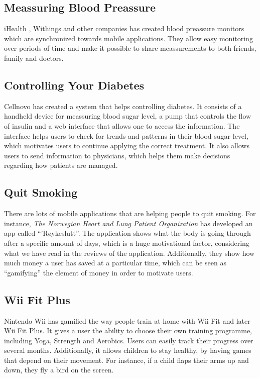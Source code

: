 \subsection{Meassuring Blood Preassure}
iHealth , Withings and other companies has created blood preassure monitors which are synchronized towards mobile applications. They allow easy monitoring over periods of time and make it possible to share meassurements to both friends, family and doctors.


\subsection{Controlling Your Diabetes}
Cellnovo has created a system that helps controlling diabetes. It consists of a handheld device for meassuring blood sugar level, a pump that controls the flow of insulin and a web interface that allows one to access the information. The interface helps users to check for trends and patterns in their blood sugar level, which motivates users to continue applying the correct treatment. It also allows users to send information to physicians, which helps them make decisions regarding how patients are managed.
      


\subsection{Quit Smoking}
There are lots of mobile applications that are helping people to quit smoking. For instance, \emph{The Norwegian Heart and Lung Patient Organization} has developed an app called ``'R\o ykeslutt''. The application shows what the body is going through after a specific amount of days, which is a huge motivational factor, considering what we have read in the reviews of the application. Additionally, they show how much money a user has saved at a particular time, which can be seen as ``gamifying'' the element of money in order to motivate users.  


\subsection{Wii Fit Plus}
Nintendo Wii has gamified the way people train at home with Wii Fit and later Wii Fit Plus. It gives a user the ability to choose their own training programme, including Yoga, Strength and Aerobics. Users can easily track their progress over several months. Additionally, it allows children to stay healthy, by having games that depend on their movement. For instance, if a child flaps their arms up and down, they fly a bird on the screen.    
 